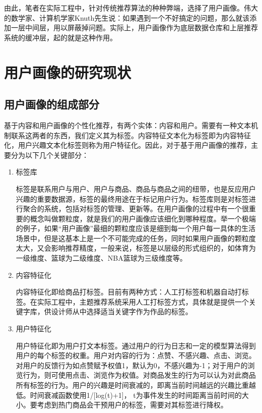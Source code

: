 	由此，笔者在实际工程中，针对传统推荐算法的种种弊端，选择了用户画像。伟大的数学家、计算机学家Knuth先生说：如果遇到一个不好搞定的问题，那么就该添加一层中间层，用以屏蔽掉问题。实际上，用户画像作为底层数据仓库和上层推荐系统的缓冲层，起的就是这种作用。

	\section{用户画像的研究现状}
		\subsection{用户画像的组成部分}
		基于内容和用户画像的个性化推荐，有两个实体：内容和用户。需要有一种文本机制联系这两者的东西，我们定义其为标签。内容特征文本化为标签即为内容特征化，用户兴趣文本化标签则称为用户特征化\citep{user-profile,user-profile1,user-profile2,user-profile3,user-profile4}。因此，对于基于用户画像的推荐，主要分为以下几个关键部分：
		\begin{enumerate}[(1)]
		\item 标签库

		标签是联系用户与用户、用户与商品、商品与商品之间的纽带，也是反应用户兴趣的重要数据源，标签的最终用途在于标记用户行为。标签库则是对标签进行聚合的系统，包括对标签的管理、更新等。在用户画像的过程中有一个很重要的概念叫做颗粒度，就是我们的用户画像应该细化到哪种程度。举一个极端的例子，如果“用户画像”最细的颗粒度应该是细到每一个用户每一具体的生活场景中，但是这基本上是一个不可能完成的任务，同时如果用户画像的颗粒度太大，又会影响推荐精度，一般来说，标签是以层级的形式组织的，如体育为一级维度、篮球为二级维度、NBA篮球为三级维度等。

		\item 内容特征化

		内容特征化即给商品打标签。目前有两种方式：人工打标签和机器自动打标签。在实际工程中，主题推荐系统采用人工打标签方式，具体就是提供一个关键字库，供设计师从中选择适当关键字作为作品的标签。

		\item 用户特征化

		用户特征化即为用户打文本标签。通过用户的行为日志和一定的模型算法得到用户的每个标签的权重。用户对内容的行为：点赞、不感兴趣、点击、浏览。对用户的反馈行为如点赞赋予权值1，默认为0，不感兴趣为-1；对于用户的浏览行为，则可使用点击、浏览作为权值。对商品发生的行为可以认为对此商品所有标签的行为。用户的兴趣是时间衰减的，即离当前时间越远的兴趣比重越低。时间衰减函数使用1/[log(t)+1]， t为事件发生的时间距离当前时间的大小。要考虑到热门商品会干预用户的标签，需要对其标签进行降权。
		\end{enumerate}

